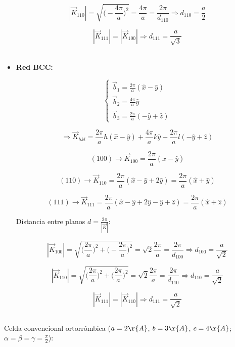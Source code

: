 \documentclass[a4paper]{article}
\begin{document}
\begin{itemize}
$$| \vec{K}_{110} | = \sqrt{\bigg(-\frac{4 \pi}{a}\bigg)^{2}} = \frac{4\pi}{a} =  \frac{2\pi}{d_{110}} \Rightarrow d_{110} = \frac{a}{2}$$

$$| \vec{K}_{111} | = | \vec{K}_{100} | \Rightarrow d_{111} = \frac{a}{\sqrt{3}}$$
\\

\item \textbf{Red BCC:}

$$\begin{cases}
\vec{b}_{1} = \frac{2 \pi}{a}(\hat{x} - \hat{y})\\
\vec{b}_{2} = \frac{4 \pi}{a}\hat{y}\\
\vec{b}_{3} = \frac{2 \pi}{a}(- \hat{y} + \hat{z})
\end{cases}$$

$$\Rightarrow \vec{K}_{hkl} = \frac{2 \pi}{a}h(\hat{x} - \hat{y}) + \frac{4 \pi}{a}k\hat{y} + \frac{2 \pi}{a}l(-\hat{y} + \hat{z})$$



$$(100) \rightarrow \vec{K}_{100} = \frac{2 \pi}{a}(\hat{x} - \hat{y})$$

$$(110) \rightarrow \vec{K}_{110} = \frac{2 \pi}{a}(\hat{x} - \hat{y} + 2\hat{y}) = \frac{2 \pi}{a}(\hat{x} + \hat{y})$$

$$(111) \rightarrow \vec{K}_{111} = \frac{2 \pi}{a}(\hat{x} - \hat{y} + 2\hat{y} - \hat{y} + \hat{z}) = \frac{2 \pi}{a}(\hat{x} + \hat{z})$$


Distancia entre planos $d = \frac{2\pi}{|\vec{K}|}$:

$$| \vec{K}_{100} | = \sqrt{\bigg(\frac{2 \pi}{a}\bigg)^{2} + \bigg(-\frac{2 \pi}{a}\bigg)^{2}} =  \sqrt{2} \frac{2\pi}{a} =  \frac{2\pi}{d_{100}} \Rightarrow d_{100} = \frac{a}{\sqrt{2}}$$

$$| \vec{K}_{110} | =  \sqrt{\bigg(\frac{2 \pi}{a}\bigg)^{2} + \bigg(\frac{2 \pi}{a}\bigg)^{2}} =  \sqrt{2} \frac{2\pi}{a} =  \frac{2\pi}{d_{110}} \Rightarrow d_{110} = \frac{a}{\sqrt{2}}$$

$$| \vec{K}_{111} | = | \vec{K}_{110} | \Rightarrow d_{111} = \frac{a}{\sqrt{2}}$$

\end{itemize}

\subsection{}

Celda convencional ortorr\'ombica ($a = 2 \r{A}$, $b = 3 \r{A}$, $c = 4 \r{A}$; $\alpha = \beta = \gamma = \frac{\pi}{2}$):
\end{document}
